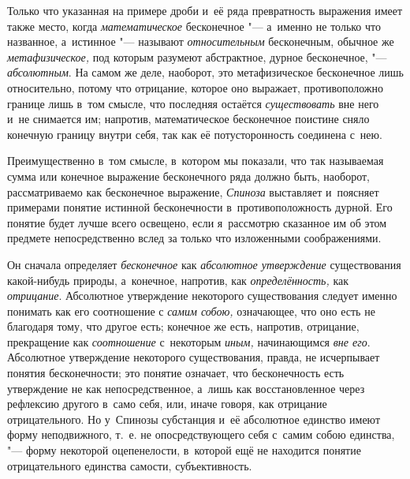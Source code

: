Только что указанная на примере дроби и~её ряда превратность выражения имеет
также место, когда {\em математическое} бесконечное "--- а~именно не только что
названное, а~истинное "--- называют {\em относительным} бесконечным,
обычное же {\em метафизическое,} под которым разумеют абстрактное,
дурное бесконечное, "--- {\em абсолютным}. На самом же деле, наоборот, это
метафизическое бесконечное лишь относительно, потому что отрицание, которое оно
выражает, противоположно границе лишь в~том смысле, что последняя остаётся
{\em существовать} вне него и~не снимается им; напротив, математическое
бесконечное поистине сняло конечную границу внутри себя, так как её
потусторонность соединена с~нею.\label{bkm:bm52b}

Преимущественно в~том смысле, в~котором мы показали, что так называемая сумма
или конечное выражение бесконечного ряда должно быть, наоборот, рассматриваемо
как бесконечное выражение, {\em Спиноза} выставляет и~поясняет примерами
понятие истинной бесконечности в~противоположность дурной. Его понятие будет
лучше всего освещено, если я~рассмотрю сказанное им об этом предмете
непосредственно вслед за только что изложенными соображениями.

\begin{midsloppypar}
Он сначала определяет {\em бесконечное} как {\em абсолютное утверждение}
существования какой-нибудь природы, а~конечное, напротив, как
{\em определённость,} как {\em отрицание}. Абсолютное утверждение некоторого
существования следует именно понимать как его соотношение с {\em самим собою,}
означающее, что оно есть не благодаря тому, что другое есть; конечное же есть,
напротив, отрицание, прекращение как {\em соотношение} с~некоторым
{\em иным,} начинающимся {\em вне его}. Абсолютное утверждение некоторого
существования, правда, не исчерпывает понятия бесконечности; это понятие
означает, что бесконечность есть утверждение не как непосредственное, а~лишь
как восстановленное через рефлексию другого в~само себя, или, иначе говоря, как
отрицание отрицательного. Но у~Спинозы субстанция и~её абсолютное единство
имеют форму неподвижного, т.~е. не опосредствующего себя с~самим собою
единства, "--- форму некоторой оцепенелости, в~которой ещё не находится понятие
отрицательного единства самости, субъективность.
\end{midsloppypar}

